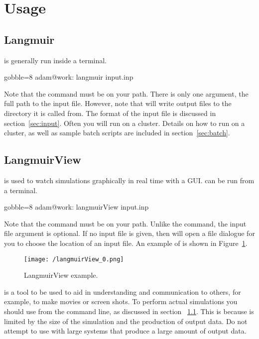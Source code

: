 \newpage
\section{Usage}
\label{sec:usage}

\subsection{Langmuir}
    \label{ssec:langmuir}
    \Langmuir is generally run inside a terminal.
    \begin{bashcode*}{gobble=8}
        adam@work: langmuir input.inp
    \end{bashcode*}
    Note that the \langmuir command must be on your path.
    There is only one argument, the full path to the input file.
    However, note that \Langmuir will write output files to the directory it is
        called from.
    The format of the input file is discussed in section~\ref{sec:input}.
    Often you will run \Langmuir on a cluster.
    Details on how to run \Langmuir on a cluster, as well as sample batch
        scripts are included in section~\ref{sec:batch}.

\subsection{LangmuirView}
    \label{ssec:langmuirview}
    \LangmuirView is used to watch simulations graphically in real
        time with a GUI.
    \LangmuirView can be run from a terminal.
    \begin{bashcode*}{gobble=8}
        adam@work: langmuirView input.inp
    \end{bashcode*}    
    Note that the \langmuirView command must be on your path.
    Unlike the \langmuir command, the input file argument is optional.
    If no input file is given, then \LangmuirView will open a file dialogue
        for you to choose the location of an input file.
    An example of \LangmuirView is shown in Figure~\ref{fig:langmuirview}.
    \begin{figure}[H]
        \centering
        \texttt{[image: /langmuirView\_0.png]}
        \caption{\label{fig:langmuirview}
            LangmuirView example.
        }
    \end{figure}
    \LangmuirView is a tool to be used to aid in understanding
        and communication to others, for example, to make movies or
        screen shots.
    To perform actual simulations you should use \Langmuir from the
        command line, as discussed in section ~\ref{ssec:langmuir}.
    This is because \LangmuirView is limited by the size of the
        simulation and the production of output data.
    Do not attempt to use \LangmuirView with large systems that
        produce a large amount of output data.
